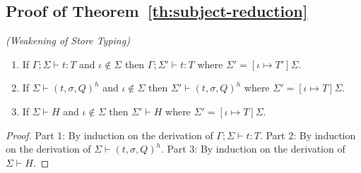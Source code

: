 \subsection{Proof of Theorem~\ref{th:subject-reduction}}\label{app:subject-reduction}

\begin{lemun}
\emph{(Weakening of Store Typing)}\label{lem:weakening-store-typing}
\begin{enumerate}
\item If $\Gamma ; \Sigma \vdash t : T$ and $\iota \notin \Sigma$ then $\Gamma ; \Sigma' \vdash t : T$ where $\Sigma' = [\iota \mapsto T']\Sigma$.
\item If $\Sigma \vdash (t, \sigma, Q)^h$ and $\iota \notin \Sigma$ then $\Sigma' \vdash (t, \sigma, Q)^h$ where $\Sigma' = [\iota \mapsto T]\Sigma$.
\item If $\Sigma \vdash H$ and $\iota \notin \Sigma$ then $\Sigma' \vdash H$ where $\Sigma' = [\iota \mapsto T]\Sigma$.
\end{enumerate}
\end{lemun}
\begin{proof}
Part 1: By induction on the derivation of $\Gamma ; \Sigma \vdash t : T$. Part 2: By induction on the derivation of $\Sigma \vdash (t, \sigma, Q)^h$. Part 3: By induction on the derivation of $\Sigma \vdash H$.
\end{proof}

